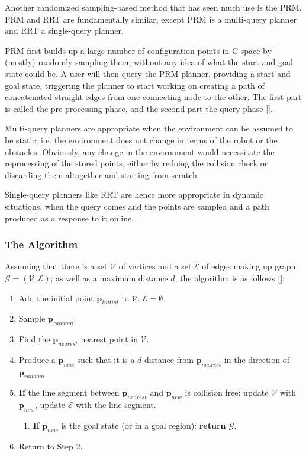 Another randomized sampling-based method that has seen much use is the \gls{PRM}. \gls{PRM} and \gls{RRT} are fundamentally similar, except \gls{PRM} is a multi-query planner and \gls{RRT} a single-query planner. 

\gls{PRM} first builds up a large number of configuration points in C-space by (mostly) randomly sampling them, without any idea of what the start and goal state could be. A user will then query the \gls{PRM} planner, providing a start and goal state, triggering the planner to start working on creating a path of concatenated straight edges from one connecting node to the other. The first part is called the pre-processing phase, and the second part the query phase [\citeauthor{Kavraki1998}].

Multi-query planners are appropriate when the environment can be assumed to be static, i.e. the environment does not change in terms of the robot or the obstacles. Obviously, any change in the environment would necessitate the reprocessing of the stored points, either by redoing the collision check or discarding them altogether and starting from scratch.

Single-query planners like \gls{RRT} are hence more appropriate in dynamic situations, when the query comes and the points are sampled and a path produced as a response to it online.

\subsubsection{The Algorithm} \label{subsubsec:RRRTAlgo}
	
Assuming that there is a set $\mathcal{V}$ of vertices and a set $\mathcal{E}$ of edges making up graph $\mathcal{G}=(\mathcal{V},\mathcal{E})$; as well as a maximum distance $d$, the algorithm is as follows [\citeauthor{Karaman2011}]:
\begin{enumerate}
	\item Add the initial point $\textbf{p}_{initial}$ to $\mathcal{V}$. $\mathcal{E} = \emptyset$.
	\item Sample $\textbf{p}_{random}$.
	\item Find the $\textbf{p}_{nearest}$ nearest point in $\mathcal{V}$.
	\item Produce a $\textbf{p}_{new}$ such that it is a $d$ distance from $\textbf{p}_{nearest}$ in the direction of  $\textbf{p}_{random}$.
	\item \textbf{If} the line segment between $\textbf{p}_{nearest}$ and $\textbf{p}_{new}$ is collision free: update $\mathcal{V}$ with $\textbf{p}_{new}$, update $\mathcal{E}$ with the line segment. 
	\begin{enumerate}
		\item \textbf{If} $\textbf{p}_{new}$ is the goal state (or in a goal region): \textbf{return} $\mathcal{G}$.
	\end{enumerate}
		\item Return to Step 2.
\end{enumerate}


